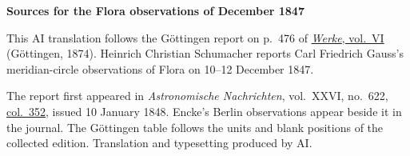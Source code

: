 \clearpage\thispagestyle{empty}
\begin{center}\textbf{Sources for the Flora observations of December 1847}\end{center}
\noindent This AI translation follows the Göttingen report on p.~476 of \href{https://gdz.sub.uni-goettingen.de/id/PPN236007467}{\textit{Werke}, vol.~VI} (Göttingen, 1874). Heinrich Christian Schumacher reports Carl Friedrich Gauss’s meridian-circle observations of Flora on 10--12 December 1847.
\par\smallskip\noindent The report first appeared in \textit{Astronomische Nachrichten}, vol.~XXVI, no.~622, \href{https://api.digitale-sammlungen.de/iiif/image/v2/bsb10049451_00186/full/1800,/0/default.jpg}{col.~352}, issued 10 January 1848. Encke’s Berlin observations appear beside it in the journal. The Göttingen table follows the units and blank positions of the collected edition. Translation and typesetting produced by AI.
\clearpage
